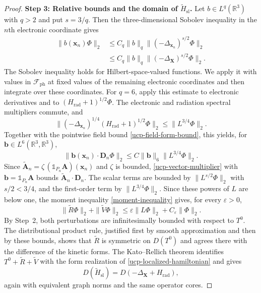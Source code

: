 \documentclass[final,reqno]{amsart}
\theoremstyle{remark}
\newcommand{\RR}{\mathbb{R}}
\newcommand{\iden}{\mathbb{1}}
\newcommand{\DC}{D}
\newcommand{\ph}{\mathrm{ph}}
\newcommand{\rad}{\mathrm{rad}}
\newcommand{\Fock}{\mathcal{F}}
\newcommand{\vx}{\mathbf{x}}
\newcommand{\vA}{{\mathbf{A}}}
\newcommand{\vX}{{\mathbf{X}}}
\newcommand{\vD}{{\mathbf{D}}}
\newcommand{\vb}{{\mathbf{b}}}
\renewcommand{\epsilon}{\varepsilon}
\begin{document}
\begin{proof}
\noindent\textbf{Step 3: Relative bounds and the domain of
$\widetilde H_{\mathrm{sl}}$.}
Let $b\in L^q(\RR^3)$ with $q>2$
and put $s=3/q$.  Then
the three-dimensional Sobolev inequality in the $n$th electronic
coordinate gives
\begin{equation}\label{ucp-coordinate-multiplier}
 \begin{split}
 \|b(\vx_n)\Phi\|_2
 &\leq C_q\|b\|_q
                 \|(-\Delta_{\vx_n})^{s/2}\Phi\|_2\\
 &\leq C_q\|b\|_q
                 \|(-\Delta_{\vX})^{s/2}\Phi\|_2.
 \end{split}
\end{equation}
The Sobolev inequality holds for Hilbert-space-valued functions.  We
apply it with values in $\Fock_\ph$ at fixed values of the remaining
electronic coordinates and then integrate over these coordinates.  For $q=6$, apply this estimate
to electronic derivatives and to $(H_\rad+1)^{1/2}\Phi$.
The electronic and radiation spectral multipliers commute, and
\[
 \|(-\Delta_{\vx_n})^{1/4}(H_\rad+1)^{1/2}\Phi\|_2
 \leq\|L^{3/4}\Phi\|_2.
\]
Together with the pointwise field bound
\cref{ucp-field-form-bound}, this yields, for
$\vb\in L^6(\RR^3,\RR^3)$,
\begin{equation}\label{ucp-vector-multiplier}
 \|\vb(\vx_n)\cdot\vD_n\Phi\|_2
 \leq C\|\vb\|_6\|L^{3/4}\Phi\|_2.
\end{equation}
Since $\widetilde\vA_n=\zeta\,(\iden_{P_n}\vA)(\vx_n)$ and $\zeta$ is
bounded, \cref{ucp-vector-multiplier} with $\vb=\iden_{P_n}\vA$ bounds
$\widetilde\vA_n\cdot\vD_n$.  The scalar terms are bounded by $\|L^{s/2}\Phi\|_2$ with
$s/2<3/4$, and the first-order term by $\|L^{3/4}\Phi\|_2$.  Since
these powers of $L$ are below one, the moment inequality
\cref{moment-inequality} gives, for every $\epsilon>0$,
\[
 \|\widetilde R\Phi\|_2+\|\widetilde V\Phi\|_2
 \leq\epsilon\|L\Phi\|_2
                         +C_\epsilon\|\Phi\|_2.
\]
By Step~2, both perturbations are infinitesimally
bounded with respect to $T^0$.  The distributional product rule, justified first by
smooth approximation and then by these bounds, shows that
$\widetilde R$ is symmetric on $\DC(T^0)$ and agrees there with the
difference of the kinetic forms.  The Kato--Rellich theorem
\cite[Theorem~V.4.3]{kato1995perturbation} identifies
$T^0+\widetilde R+\widetilde V$ with the form realization of
\cref{ucp-localized-hamiltonian} and gives
\begin{equation}\label{ucp-truncated-domain}
 \DC(\widetilde H_{\mathrm{sl}})=\DC(-\Delta_{\vX}+H_\rad),
\end{equation}
again with equivalent graph norms and the same operator cores.


\end{proof}
\end{document}
